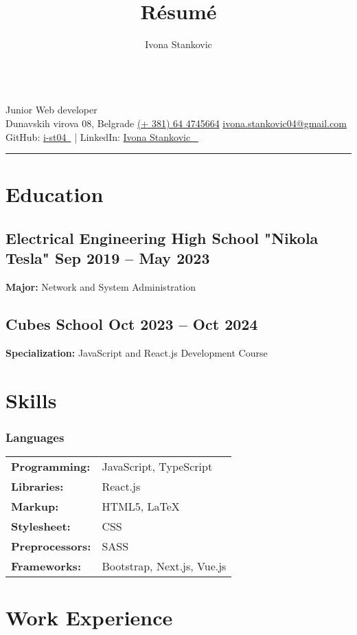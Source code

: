 \documentclass[11pt]{article}
\title{Résumé}
\author{Ivona Stankovic}
\date{}
\makeatletter
\renewcommand{\maketitle}{
  \begin{center}
    {\huge\bfseries \theauthor} \\[0.3em]
    {\large\sffamily Junior Web developer} \\[0.3em]
    \small\sffamily
    Dunavskih virova 08, Belgrade \textbullet{}
    \href{tel:+381644745664}{(+ 381) 64 4745664} \textbullet{}
    \href{mailto:ivona.stankovic04@gmail.com}{ivona.stankovic04@gmail.com} \\[0.75em]
    
    \textcolor{bodytext}{
      {\footnotesize GitHub:} \href{https://github.com/i-st04}{i-st04~\textcolor{gray}{\faExternalLink*}} \quad |
  {\footnotesize LinkedIn:} \href{https://www.linkedin.com/in/ivona-stanković-724b0935a/}{Ivona Stankovic ~\textcolor{gray}{\faExternalLink*}} \quad
    }
  \end{center}
  \vspace{1em}
  \hrule
  \vspace{0em}
}
\makeatother
\begin{document}
\maketitle

\section*{Education}

\subsection*{Electrical Engineering High School "Nikola Tesla" \hfill Sep 2019 -- May 2023 \\}
\textbf{Major:} Network and System Administration

\subsection*{Cubes School \hfill Oct 2023 -- Oct 2024 \\}
\textbf{Specialization:} JavaScript and React.js Development Course


\section*{Skills}

\subsubsection*{Languages}

\par

\noindent
\begin{minipage}{\linewidth}
\begin{tabular}{@{}ll}
\textbf{Programming:}   & JavaScript, TypeScript \\
\textbf{Libraries:}     & React.js \\
\textbf{Markup:}        & HTML5, \LaTeX \\
\textbf{Stylesheet:}    & CSS \\
\textbf{Preprocessors:} & SASS \\
\textbf{Frameworks:}    & Bootstrap, Next.js, Vue.js \\
\end{tabular}
\end{minipage}
\section*{Work Experience}
\end{document}
